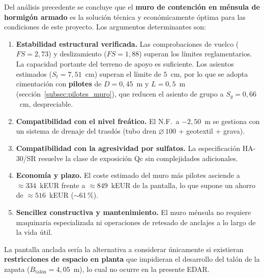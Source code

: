 \begin{supuestobox}
  Del análisis precedente se concluye que el \textbf{muro de contención
  en ménsula de hormigón armado} es la solución técnica y
  económicamente óptima para las condiciones de este proyecto. Los
  argumentos determinantes son:

  \begin{enumerate}
    \item \textbf{Estabilidad estructural verificada.} Las comprobaciones de
          vuelco ($FS = 2{,}73$) y deslizamiento ($FS = 1{,}88$) superan
          los límites reglamentarios. La capacidad portante del terreno de
          apoyo es suficiente. Los asientos estimados ($S_t = 7{,}51$~cm)
          superan el límite de $5$~cm, por lo que se adopta cimentación
          con \textbf{pilotes} de $D = 0{,}45$~m y $L = 0{,}5$~m
          (sección~\ref{subsec:pilotes_muro}), que reducen el asiento
          de grupo a $S_g = 0{,}66$~cm, despreciable.

    \item \textbf{Compatibilidad con el nivel freático.} El N.F.\ a
          $-2{,}50$~m se gestiona con un sistema de drenaje del trasdós
          (tubo dren $\varnothing\,100$ + geotextil + grava). 

    \item \textbf{Compatibilidad con la agresividad por sulfatos.}
          La especificación HA-30/SR resuelve la clase de exposición Qc
          sin complejidades adicionales.

    \item \textbf{Economía y plazo.} El coste estimado del muro más
          pilotes asciende a $\approx 334$~kEUR frente a $\approx 849$~kEUR
          de la pantalla, lo que supone un ahorro de $\approx 516$~kEUR
          ($\sim$61\,\%).

    \item \textbf{Sencillez constructiva y mantenimiento.} El muro ménsula
          no requiere maquinaria especializada ni operaciones de retesado
          de anclajes a lo largo de la vida útil.
  \end{enumerate}

  La pantalla anclada sería la alternativa a considerar únicamente si
  existieran \textbf{restricciones de espacio en planta} que impidieran
  el desarrollo del talón de la zapata ($B_\text{talón} = 4{,}05$~m),
  lo cual no ocurre en la presente EDAR.
\end{supuestobox}
